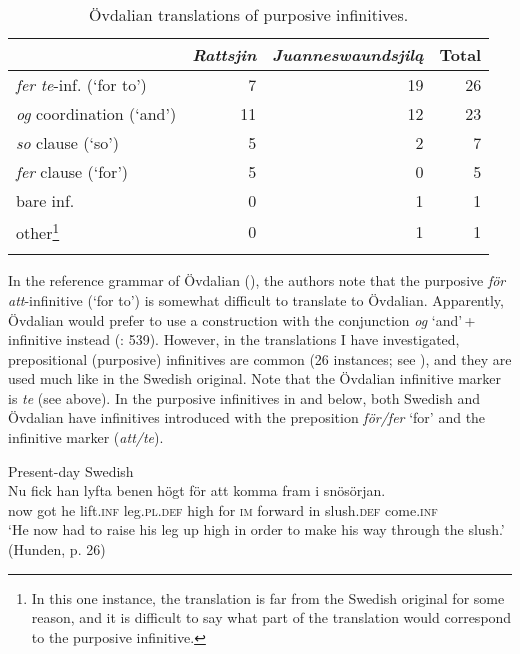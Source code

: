 \documentclass[output=paper]{langscibook}
\begin{document}
\begin{table}
\caption{Övdalian translations of purposive infinitives.\label{tab:kalm:4}}
\begin{tabular}{lrrr} 
\lsptoprule
& \textit{Rattsjin} & \textit{Juanneswaundsjilą} & Total\\\midrule
\textit{fer te}{}-inf. (‘for to’) & 7 & 19 & 26\\
\textit{og} coordination (‘and’) & 11 & 12 & 23\\
\textit{so} clause (‘so’) & 5 & 2 & 7\\
\textit{fer} clause (‘for’) & 5 & 0 & 5\\
bare inf. & 0 & 1 & 1\\
other\footnote{In this one instance, the translation is far from the Swedish original for some reason, and it is difficult to say what part of the translation would correspond to the purposive infinitive.} & 0 & 1 & 1\\
\lspbottomrule
\end{tabular}
\end{table}

In the reference grammar of Övdalian (\citealt{AkerbergNystrom2012}), the authors note that the purposive \textit{för att}{}-infinitive (‘for to’) is somewhat difficult to translate to Övdalian. Apparently, Övdalian would prefer to use a construction with the conjunction \textit{og} ‘and’\,+\,infinitive instead (\citealt{AkerbergNystrom2012}: 539). However, in the translations I have investigated, prepositional (purposive) infinitives are common (26 instances; see ), and they are used much like in the Swedish original. Note that the Övdalian infinitive marker is \textit{te} (see  above). In the purposive infinitives in  and  below, both Swedish and Övdalian have infinitives introduced with the preposition \textit{för/fer} ‘for’ and the infinitive marker (\textit{att/te}).


\ea
\label{ex:kalm:15}
\ea Present-day Swedish\\\label{ex:kalm:15a}
\gll Nu fick han lyfta benen högt för att komma fram i snösörjan.\\
now got he lift.\textsc{inf} leg.\textsc{pl.def} high for \textsc{im} forward in slush.\textsc{def} come.\textsc{inf}\\ 
\glt ‘He now had to raise his leg up high in order to make his way through the slush.’ (Hunden, p. 26)
\end{document}
